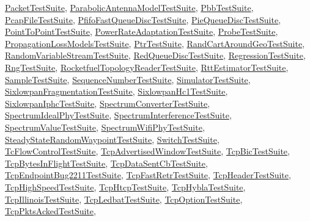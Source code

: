\hyperlink{classPacketTestSuite}{Packet\+Test\+Suite}, \hyperlink{classParabolicAntennaModelTestSuite}{Parabolic\+Antenna\+Model\+Test\+Suite}, \hyperlink{classPbbTestSuite}{Pbb\+Test\+Suite}, \hyperlink{classPcapFileTestSuite}{Pcap\+File\+Test\+Suite}, \hyperlink{classPfifoFastQueueDiscTestSuite}{Pfifo\+Fast\+Queue\+Disc\+Test\+Suite}, \hyperlink{classPieQueueDiscTestSuite}{Pie\+Queue\+Disc\+Test\+Suite}, \hyperlink{classPointToPointTestSuite}{Point\+To\+Point\+Test\+Suite}, \hyperlink{classPowerRateAdaptationTestSuite}{Power\+Rate\+Adaptation\+Test\+Suite}, \hyperlink{classProbeTestSuite}{Probe\+Test\+Suite}, \hyperlink{classPropagationLossModelsTestSuite}{Propagation\+Loss\+Models\+Test\+Suite}, \hyperlink{classPtrTestSuite}{Ptr\+Test\+Suite}, \hyperlink{classRandCartAroundGeoTestSuite}{Rand\+Cart\+Around\+Geo\+Test\+Suite}, \hyperlink{classRandomVariableStreamTestSuite}{Random\+Variable\+Stream\+Test\+Suite}, \hyperlink{classRedQueueDiscTestSuite}{Red\+Queue\+Disc\+Test\+Suite}, \hyperlink{classRegressionTestSuite}{Regression\+Test\+Suite}, \hyperlink{classRngTestSuite}{Rng\+Test\+Suite}, \hyperlink{classRocketfuelTopologyReaderTestSuite}{Rocketfuel\+Topology\+Reader\+Test\+Suite}, \hyperlink{classRttEstimatorTestSuite}{Rtt\+Estimator\+Test\+Suite}, \hyperlink{classSampleTestSuite}{Sample\+Test\+Suite}, \hyperlink{classSequenceNumberTestSuite}{Sequence\+Number\+Test\+Suite}, \hyperlink{classSimulatorTestSuite}{Simulator\+Test\+Suite}, \hyperlink{classSixlowpanFragmentationTestSuite}{Sixlowpan\+Fragmentation\+Test\+Suite}, \hyperlink{classSixlowpanHc1TestSuite}{Sixlowpan\+Hc1\+Test\+Suite}, \hyperlink{classSixlowpanIphcTestSuite}{Sixlowpan\+Iphc\+Test\+Suite}, \hyperlink{classSpectrumConverterTestSuite}{Spectrum\+Converter\+Test\+Suite}, \hyperlink{classSpectrumIdealPhyTestSuite}{Spectrum\+Ideal\+Phy\+Test\+Suite}, \hyperlink{classSpectrumInterferenceTestSuite}{Spectrum\+Interference\+Test\+Suite}, \hyperlink{classSpectrumValueTestSuite}{Spectrum\+Value\+Test\+Suite}, \hyperlink{classSpectrumWifiPhyTestSuite}{Spectrum\+Wifi\+Phy\+Test\+Suite}, \hyperlink{structSteadyStateRandomWaypointTestSuite}{Steady\+State\+Random\+Waypoint\+Test\+Suite}, \hyperlink{classSwitchTestSuite}{Switch\+Test\+Suite}, \hyperlink{classTcFlowControlTestSuite}{Tc\+Flow\+Control\+Test\+Suite}, \hyperlink{classTcpAdvertisedWindowTestSuite}{Tcp\+Advertised\+Window\+Test\+Suite}, \hyperlink{classTcpBicTestSuite}{Tcp\+Bic\+Test\+Suite}, \hyperlink{classTcpBytesInFlightTestSuite}{Tcp\+Bytes\+In\+Flight\+Test\+Suite}, \hyperlink{classTcpDataSentCbTestSuite}{Tcp\+Data\+Sent\+Cb\+Test\+Suite}, \hyperlink{classTcpEndpointBug2211TestSuite}{Tcp\+Endpoint\+Bug2211\+Test\+Suite}, \hyperlink{classTcpFastRetrTestSuite}{Tcp\+Fast\+Retr\+Test\+Suite}, \hyperlink{classTcpHeaderTestSuite}{Tcp\+Header\+Test\+Suite}, \hyperlink{classTcpHighSpeedTestSuite}{Tcp\+High\+Speed\+Test\+Suite}, \hyperlink{classTcpHtcpTestSuite}{Tcp\+Htcp\+Test\+Suite}, \hyperlink{classTcpHyblaTestSuite}{Tcp\+Hybla\+Test\+Suite}, \hyperlink{classTcpIllinoisTestSuite}{Tcp\+Illinois\+Test\+Suite}, \hyperlink{classTcpLedbatTestSuite}{Tcp\+Ledbat\+Test\+Suite}, \hyperlink{classTcpOptionTestSuite}{Tcp\+Option\+Test\+Suite}, \hyperlink{classTcpPktsAckedTestSuite}{Tcp\+Pkts\+Acked\+Test\+Suite}, 